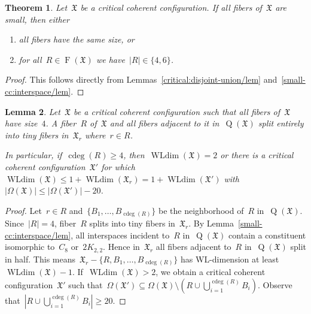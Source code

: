 \documentclass[english,a4paper]{article}
\theoremstyle{plain}
\newtheorem{theorem}             {Theorem}[section]
\newtheorem{lemma}      [theorem]{Lemma}
\theoremstyle{definition}
\newcommand{\abs}[1]{| #1 |}
\DeclareMathOperator{\Fibers}{F}
\newcommand{\coherentConfig}{\ensuremath{\mathfrak{X}}}
\newcommand{\fibers}[1]{\ensuremath{\Fibers \left( #1 \right)}}
\newcommand{\vertices}{\ensuremath{\Omega}}
\DeclareMathOperator*{\WLdim}{WLdim}
\newcommand{\wldim}[1]{\ensuremath{\WLdim\left(#1\right)}}
\DeclareMathOperator*{\Quotient}{Q}
\newcommand{\quotientGraph}[1]{\ensuremath{\Quotient(#1)}}
\DeclareMathOperator{\ColorDeg}{cdeg}
\newcommand{\colorDeg}[1]{\ensuremath{\ColorDeg\left(#1\right)}}
\newcommand{\clique}[1]{\ensuremath{K_{#1}}}
\newcommand{\cycle}[1]{\ensuremath{C_{#1}}}
\newcommand{\disjointCliques}[2]{\ensuremath{#1 \clique{#2}}}
\begin{document}
\begin{theorem}
    \label{critical:small-cc/thm}
    Let~$\coherentConfig$ be a critical coherent configuration.
    If all fibers of~$\coherentConfig$ are small, then either
    \begin{enumerate}
        \item all fibers have the same size, or
        \item for all~$R \in \fibers{\coherentConfig}$ we have~$\abs{R} \in \{4,6\}$.
    \end{enumerate}
\end{theorem}
\begin{proof}
    This follows directly from Lemmas~\ref{critical:disjoint-union/lem} and~\ref{small-cc:interspace/lem}.
\end{proof}


\begin{lemma}
\label{4-cc:cdeg-decrease/lem}
    Let~$\coherentConfig$ be a critical coherent configuration such that all fibers of~$\coherentConfig$ have size~$4$.
    A fiber~$R$ of~$\coherentConfig$ and all fibers adjacent to it in~$\quotientGraph{\coherentConfig}$ split entirely into tiny fibers in~$\coherentConfig_r$ where~$r \in R$.

    In particular, if~$\colorDeg{R} \geq 4$, then~$\wldim{\coherentConfig}=2$ or  there is a critical coherent configuration~$\coherentConfig'$ for which $\wldim{\coherentConfig} \leq  1 + \wldim{\coherentConfig_r} = 1 + \wldim{\coherentConfig'}$ with~$\abs{\vertices(\coherentConfig)} \leq \abs{\vertices(\coherentConfig')} - 20$.
\end{lemma}
\begin{proof}
    Let~$r \in R$ and~$\{B_1, \dots, B_{\colorDeg{R}}\}$ be the neighborhood of~$R$ in~$\quotientGraph{\coherentConfig}$.
    Since~$|R| = 4$, fiber~$R$ splits into tiny fibers in~$\coherentConfig_r$.
    By Lemma~\ref{small-cc:interspace/lem}, all interspaces incident to~$R$ in~$\quotientGraph{\coherentConfig}$ contain a constituent isomorphic to~$\cycle{8}$ or~$\disjointCliques{2}{2,2}$.
    Hence in~$\coherentConfig_r$ all fibers adjacent to~$R$ in~$\quotientGraph{\coherentConfig}$ split in half.
    This means~$\coherentConfig_r- \{R,B_1,\ldots,B_{\colorDeg{R}}\}$ has WL-dimension at least~$\wldim{\coherentConfig}-1$.
    If~$\wldim{\coherentConfig}>2$, we obtain a critical coherent configuration~$\coherentConfig'$ such that~$\vertices(\coherentConfig') \subseteq \vertices(\coherentConfig) \setminus (R \cup \bigcup_{i=1}^{\colorDeg{R}}B_i)$.
    Observe that~$|R \cup \bigcup_{i=1}^{\colorDeg{R}} B_i| \geq 20$.
\end{proof}
\end{document}
